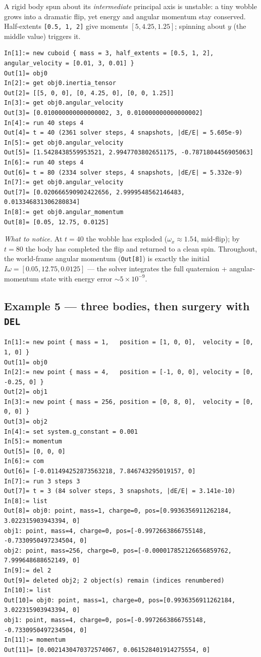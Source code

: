 \documentclass[11pt]{article}
\newcommand{\kw}[1]{\texttt{\uppercase{#1}}}
\newcommand{\code}[1]{\texttt{#1}}
\begin{document}
A rigid body spun about its \emph{intermediate} principal axis is
unstable: a tiny wobble grows into a dramatic flip, yet energy and
angular momentum stay conserved. Half-extents \code{[0.5, 1, 2]} give
moments $[5, 4.25, 1.25]$; spinning about $y$ (the middle value)
triggers it.

\begin{lstlisting}
In[1]:= new cuboid { mass = 3, half_extents = [0.5, 1, 2], angular_velocity = [0.01, 3, 0.01] }
Out[1]= obj0
In[2]:= get obj0.inertia_tensor
Out[2]= [[5, 0, 0], [0, 4.25, 0], [0, 0, 1.25]]
In[3]:= get obj0.angular_velocity
Out[3]= [0.010000000000000002, 3, 0.010000000000000002]
In[4]:= run 40 steps 4
Out[4]= t = 40 (2361 solver steps, 4 snapshots, |dE/E| = 5.605e-9)
In[5]:= get obj0.angular_velocity
Out[5]= [1.5428438559953521, 2.9947703802651175, -0.7871804456905063]
In[6]:= run 40 steps 4
Out[6]= t = 80 (2334 solver steps, 4 snapshots, |dE/E| = 5.332e-9)
In[7]:= get obj0.angular_velocity
Out[7]= [0.020666590902422656, 2.9999548562146483, 0.013346831306280834]
In[8]:= get obj0.angular_momentum
Out[8]= [0.05, 12.75, 0.0125]
\end{lstlisting}

\emph{What to notice.} At $t=40$ the wobble has exploded
($\omega_x\approx1.54$, mid-flip); by $t=80$ the body has completed the
flip and returned to a clean spin. Throughout, the world-frame angular
momentum (\code{Out[8]}) is exactly the initial
$I\omega = [0.05, 12.75, 0.0125]$ --- the solver integrates the full
quaternion + angular-momentum state with energy error
$\sim 5\times10^{-9}$.

\subsection{Example 5 --- three bodies, then surgery with \kw{del}}

\begin{lstlisting}
In[1]:= new point { mass = 1,   position = [1, 0, 0],  velocity = [0, 1, 0] }
Out[1]= obj0
In[2]:= new point { mass = 4,   position = [-1, 0, 0], velocity = [0, -0.25, 0] }
Out[2]= obj1
In[3]:= new point { mass = 256, position = [0, 8, 0],  velocity = [0, 0, 0] }
Out[3]= obj2
In[4]:= set system.g_constant = 0.001
In[5]:= momentum
Out[5]= [0, 0, 0]
In[6]:= com
Out[6]= [-0.011494252873563218, 7.846743295019157, 0]
In[7]:= run 3 steps 3
Out[7]= t = 3 (84 solver steps, 3 snapshots, |dE/E| = 3.141e-10)
In[8]:= list
Out[8]= obj0: point, mass=1, charge=0, pos=[0.9936356911262184, 3.022315903943394, 0]
obj1: point, mass=4, charge=0, pos=[-0.9972663866755148, -0.7330950497234504, 0]
obj2: point, mass=256, charge=0, pos=[-0.000017852126656859762, 7.999648688652149, 0]
In[9]:= del 2
Out[9]= deleted obj2; 2 object(s) remain (indices renumbered)
In[10]:= list
Out[10]= obj0: point, mass=1, charge=0, pos=[0.9936356911262184, 3.022315903943394, 0]
obj1: point, mass=4, charge=0, pos=[-0.9972663866755148, -0.7330950497234504, 0]
In[11]:= momentum
Out[11]= [0.0021430470372574067, 0.061528401914275554, 0]
\end{lstlisting}
\end{document}
